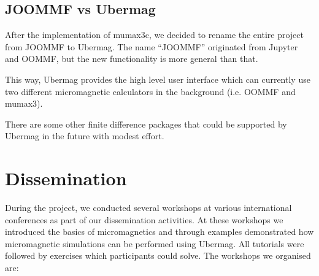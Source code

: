 \documentclass{deliverablereport}
\begin{document}
\subsection{JOOMMF vs Ubermag}

After the implementation of mumax3c, we decided to rename the entire
project from JOOMMF to Ubermag. The name ``JOOMMF'' originated from
Jupyter and OOMMF, but the new functionality is more general than
that.

This way, Ubermag provides the high level user interface which can
currently use two different micromagnetic calculators in the
background (i.e. OOMMF and mumax3).

There are some other finite difference packages that could be supported by
Ubermag in the future with modest effort.

\section{Dissemination}

During the project, we conducted several workshops at various
international conferences as part of our dissemination activities. At
these workshops we introduced the basics of micromagnetics and through
examples demonstrated how micromagnetic simulations can be performed
using Ubermag. All tutorials were followed by exercises which
participants could solve. The workshops we organised are:
\end{document}
